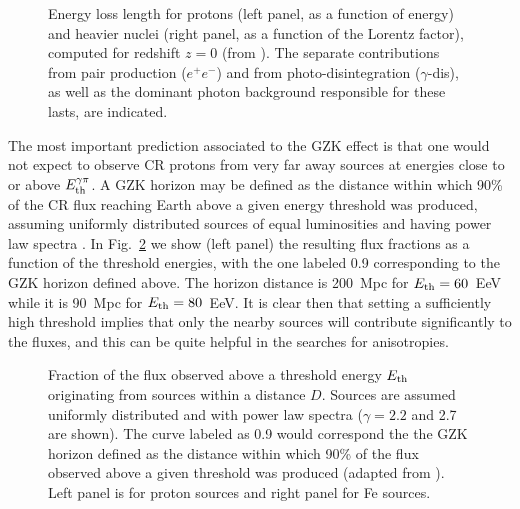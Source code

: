 \documentclass[twoside,12pt]{article}
\begin{document}
\begin{figure}[tb]
\begin{center}
\begin{minipage}[t]{8 cm}
\centerline{}
\end{minipage}
\caption{Energy loss length for protons (left panel, as a function of energy) and heavier nuclei (right panel, as a function of the Lorentz factor), computed for redshift $z=0$ (from \cite{hmr15}). The separate contributions from pair production ($e^+e^-$) and from photo-disintegration ($\gamma$-dis), as well as the dominant photon background responsible for these lasts, are indicated. \label{eloss.fig}}
\end{center}
\end{figure}

The most important prediction associated to the GZK effect is that one would not expect to observe CR protons from very far away sources at energies close to or above $E_{\rm th}^{\gamma\pi}$. A GZK horizon may be defined as the distance within which 90\% of the CR flux reaching Earth above a given energy threshold was produced, assuming uniformly distributed sources of equal luminosities and having power law spectra \cite{horizon}. In Fig.~\ref{gzkatt.fig} we show (left panel) the resulting flux fractions as a function of the threshold energies, with the one labeled 0.9 corresponding to the GZK horizon defined above. The horizon distance is 200~Mpc for $E_{\rm th}=60$~EeV while it is 90~Mpc for $E_{\rm th}=80$~EeV. It is clear then that setting a sufficiently high threshold implies that only the nearby sources will contribute significantly to the fluxes, and this can be quite helpful in the searches for anisotropies. 

\begin{figure}[tb]
\begin{center}
\begin{minipage}[t]{8 cm}
\centerline{}
\end{minipage}
\caption{Fraction of the flux observed above a threshold energy $E_{\rm th}$ originating  from sources within a distance $D$. Sources are assumed uniformly distributed and with power law spectra ($\gamma=2.2$ and 2.7  are shown). The curve labeled as 0.9 would correspond the the GZK horizon defined as the distance within which 90\% of the flux observed above a given threshold  was produced (adapted from \cite{horizon}).  Left panel is for proton sources and right panel for Fe sources.\label{gzkatt.fig}}
\end{center}
\end{figure}
\end{document}

